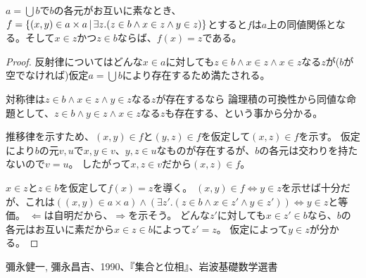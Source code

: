 \documentclass[uplatex,papersize,dvipdfmx]{jsarticle}
\begin{document}
    \begin{theorem}
      $a = \bigcup b$で$b$の各元がお互いに素なとき、$f = \{ (x, y) \in a \times a \, | \, \exists z. (z \in b \land x \in z \land y \in z) \}$とすると$f$は$a$上の同値関係となる。そして$x \in z$かつ$z \in b$ならば、$f(x) = z$である。
      \begin{proof}
        反射律についてはどんな$x \in a$に対しても$z \in b \land x \in z \land x \in z$なる$z$が($b$が空でなければ)仮定$a = \bigcup b$により存在するため満たされる。

        対称律は$z \in b \land x \in z \land y \in z$なる$z$が存在するなら
        論理積の可換性から同値な命題として、$z \in b \land y \in z \land x \in z$なる$z$も存在する、という事から分かる。

        推移律を示すため、$(x, y) \in f$と$(y, z) \in f$を仮定して$(x, z) \in f$を示す。
        仮定により$b$の元$v, u$で$x, y \in v$、$y, z \in u$なものが存在するが、$b$の各元は交わりを持たないので$v = u$。
        したがって$x, z \in v$だから$(x, z) \in f$。

        $x \in z $と$z \in b$を仮定して$f(x) = z$を導く。
        $(x, y) \in f \Leftrightarrow y \in z$を示せば十分だが、これは$((x, y) \in a \times a) \land (\exists z'. (z \in b \land x \in z' \land y \in z')) \Leftrightarrow y \in z$と等価。
        $\Leftarrow$は自明だから、$\Rightarrow$を示そう。
        どんな$z'$に対しても$x \in z' \in b$なら、$b$の各元はお互いに素だから$x \in z \in b$によって$z' = z$。
        仮定によって$y \in z$が分かる。
      \end{proof}
    \end{theorem}
  \begin{thebibliography}{99}
      彌永健一, 彌永昌吉、1990、『集合と位相』、岩波基礎数学選書
  \end{thebibliography}
\end{document}
